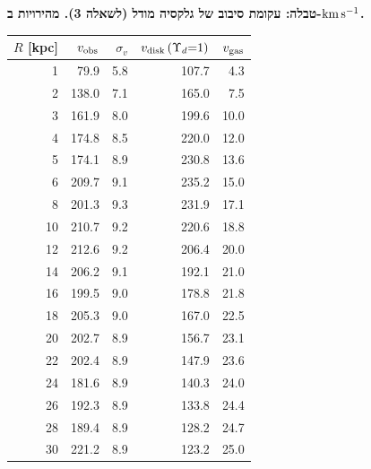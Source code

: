 \documentclass[11pt,a4paper]{article}
\begin{document}
\clearpage
\begin{center}
\textbf{טבלה: עקומת סיבוב של גלקסיה מודל (לשאלה 3). מהירויות ב-$\mathrm{km\,s^{-1}}$.}\\[6pt]
\begin{otherlanguage}{english}
\begin{tabular}{rrrrr}
\toprule
$R$ [kpc] & $v_{\rm obs}$ & $\sigma_v$ & $v_{\rm disk}\,(\Upsilon_d{=}1)$ & $v_{\rm gas}$\\
\midrule
1 & 79.9 & 5.8 & 107.7 & 4.3 \\
2 & 138.0 & 7.1 & 165.0 & 7.5 \\
3 & 161.9 & 8.0 & 199.6 & 10.0 \\
4 & 174.8 & 8.5 & 220.0 & 12.0 \\
5 & 174.1 & 8.9 & 230.8 & 13.6 \\
6 & 209.7 & 9.1 & 235.2 & 15.0 \\
8 & 201.3 & 9.3 & 231.9 & 17.1 \\
10 & 210.7 & 9.2 & 220.6 & 18.8 \\
12 & 212.6 & 9.2 & 206.4 & 20.0 \\
14 & 206.2 & 9.1 & 192.1 & 21.0 \\
16 & 199.5 & 9.0 & 178.8 & 21.8 \\
18 & 205.3 & 9.0 & 167.0 & 22.5 \\
20 & 202.7 & 8.9 & 156.7 & 23.1 \\
22 & 202.4 & 8.9 & 147.9 & 23.6 \\
24 & 181.6 & 8.9 & 140.3 & 24.0 \\
26 & 192.3 & 8.9 & 133.8 & 24.4 \\
28 & 189.4 & 8.9 & 128.2 & 24.7 \\
30 & 221.2 & 8.9 & 123.2 & 25.0 \\
\bottomrule
\end{tabular}
\end{otherlanguage}
\end{center}
\end{document}
